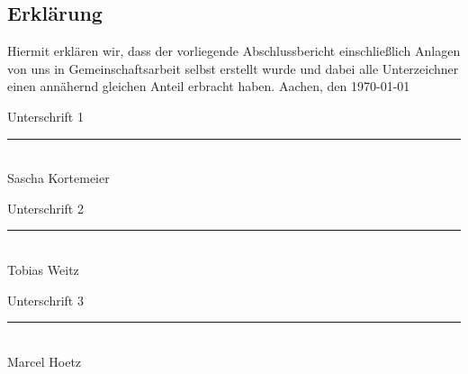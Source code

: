 \documentclass[a4paper, 12pt]{report}
\begin{document}
\begin{flushleft}
%
%
%
%
%
%
%
%
%
%
%
%
%
%
%
%
%

\chapter{Erklärung}
Hiermit erklären wir, dass der vorliegende Abschlussbericht einschließlich Anlagen von uns in Gemeinschaftsarbeit selbst erstellt wurde und dabei alle Unterzeichner einen annähernd gleichen Anteil erbracht haben.\newline \newline
Aachen, den \today
\newline \newline

Unterschrift 1
\newline \newline
\rule{5cm}{0.4pt}
\\
Sascha Kortemeier
\newline \newline \newline

Unterschrift 2
\newline \newline
\rule{5cm}{0.4pt}
\\
Tobias Weitz
\newline \newline \newline

Unterschrift 3
\newline \newline
\rule{5cm}{0.4pt}
\\
Marcel Hoetz

\end{flushleft}
\end{document}
